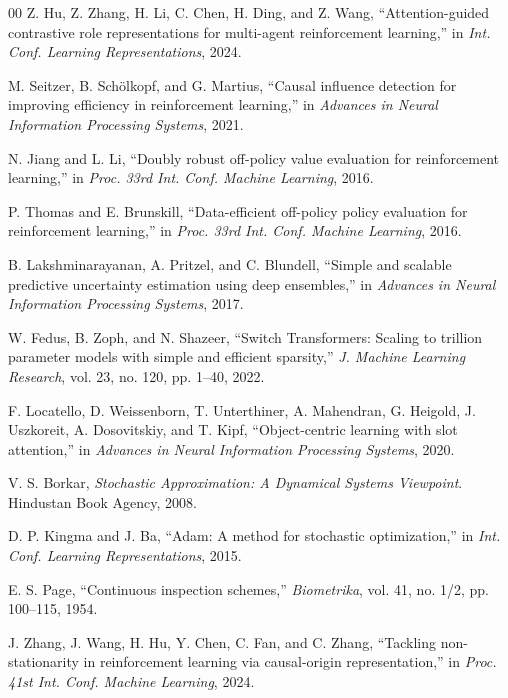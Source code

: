 \documentclass[conference]{IEEEtran}
\begin{document}
\begin{thebibliography}{00}
 Z. Hu, Z. Zhang, H. Li, C. Chen, H. Ding, and Z. Wang, ``Attention-guided contrastive role representations for multi-agent reinforcement learning,'' in \textit{Int. Conf. Learning Representations}, 2024.

 M. Seitzer, B. Sch\"{o}lkopf, and G. Martius, ``Causal influence detection for improving efficiency in reinforcement learning,'' in \textit{Advances in Neural Information Processing Systems}, 2021.

 N. Jiang and L. Li, ``Doubly robust off-policy value evaluation for reinforcement learning,'' in \textit{Proc. 33rd Int. Conf. Machine Learning}, 2016.

 P. Thomas and E. Brunskill, ``Data-efficient off-policy policy evaluation for reinforcement learning,'' in \textit{Proc. 33rd Int. Conf. Machine Learning}, 2016.

 B. Lakshminarayanan, A. Pritzel, and C. Blundell, ``Simple and scalable predictive uncertainty estimation using deep ensembles,'' in \textit{Advances in Neural Information Processing Systems}, 2017.

 W. Fedus, B. Zoph, and N. Shazeer, ``Switch Transformers: Scaling to trillion parameter models with simple and efficient sparsity,'' \textit{J. Machine Learning Research}, vol. 23, no. 120, pp. 1--40, 2022.

 F. Locatello, D. Weissenborn, T. Unterthiner, A. Mahendran, G. Heigold, J. Uszkoreit, A. Dosovitskiy, and T. Kipf, ``Object-centric learning with slot attention,'' in \textit{Advances in Neural Information Processing Systems}, 2020.

 V. S. Borkar, \textit{Stochastic Approximation: A Dynamical Systems Viewpoint}. Hindustan Book Agency, 2008.

 D. P. Kingma and J. Ba, ``Adam: A method for stochastic optimization,'' in \textit{Int. Conf. Learning Representations}, 2015.

 E. S. Page, ``Continuous inspection schemes,'' \textit{Biometrika}, vol. 41, no. 1/2, pp. 100--115, 1954.

 J. Zhang, J. Wang, H. Hu, Y. Chen, C. Fan, and C. Zhang, ``Tackling non-stationarity in reinforcement learning via causal-origin representation,'' in \textit{Proc. 41st Int. Conf. Machine Learning}, 2024.


\end{thebibliography}
\end{document}

